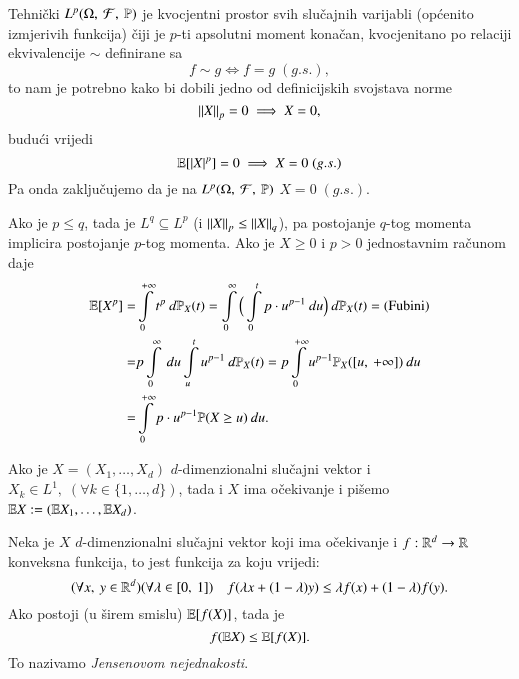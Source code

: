 \begin{nap} \label{nap:5.11-5}
    Tehni\v cki $L^p (\Omega, \: \mathcal{F}, \: \mathbb{P})$ je kvocjentni prostor svih slu\v cajnih varijabli (op\' cenito izmjerivih funkcija) \v ciji je $p$-ti apsolutni moment kona\v can, kvocjenitano po relaciji ekvivalencije $\sim$ definirane sa
    \begin{equation*}
        f \sim g \iff f = g \; (g.s.),
    \end{equation*}
    to nam je potrebno kako bi dobili jedno od definicijskih svojstava norme
    \begin{equation*}
        \left\lVert {X} \right\rVert_p = 0 \implies X = 0,
    \end{equation*}
    budu\' ci vrijedi
    \begin{equation*}
        \mathbb{E} [|X|^p] = 0 \implies X = 0 \; (g.s.)
    \end{equation*}
    Pa onda zaklju\v cujemo da je na $L^p (\Omega, \: \mathcal{F}, \: \mathbb{P})$ $X = 0 \; (g.s.)$.
\end{nap}

Ako je $p \leq q$, tada je $L^q \subseteq L^p$ (i $\left\lVert {X} \right\rVert_p \leq \left\lVert {X} \right\rVert_q$), pa postojanje $q$-tog momenta implicira postojanje $p$-tog momenta.
Ako je $X \geq 0$ i $p > 0$ jednostavnim ra\v cunom daje
\begin{align}   \label{jed:5.12}
    \begin{split}
        \mathbb{E} [ X^p ] =& \int\limits_0^{+\infty} t^p \: d \mathbb{P}_X (t) = \int\limits_0^{\infty} \Big( \int\limits_0^t p \cdot u^{p - 1} \: d u \Big) \: d \mathbb{P}_X(t) = (\textnormal{Fubini})\\
        =& p \int\limits_0^{\infty} \: du \int\limits_u^t u ^{p-1} \: d \mathbb{P}_X (t) = p \int\limits_0^{+\infty} u^{p-1} \mathbb{P}_X ([{u}, \:{+\infty}]) \: du \\
        =& \int\limits_0^{+\infty} p \cdot u^{p-1} \mathbb{P}({X \geq u}) \: du.
    \end{split}
\end{align}

Ako je $X = (X_1, \ldots, X_d)$ $d$-dimenzionalni slu\v cajni vektor i $X_k \in L^1, \; (\forall k \in \{1, \ldots, d\})$, tada i $X$ ima o\v cekivanje i pi\v semo $\mathbb{E} X := (\mathbb{E} X_1, \ldots, \mathbb{E} X_d)$.

\begin{zad} \label{zad:5.13}
    Neka je $X$ $d$-dimenzionalni slu\v cajni vektor koji ima o\v cekivanje i $f: \mathbb{R}^d \to \mathbb{R}$ konveksna funkcija, to jest funkcija za koju vrijedi:
    \begin{equation*}
        (\forall x, \: y \in \mathbb{R}^d)(\forall \lambda \in [{0}, \:{1}]) \quad f (\lambda x + (1 - \lambda) y) \leq \lambda f(x) + (1 - \lambda) f(y).
    \end{equation*}
    Ako  postoji (u \v sirem smislu) $\mathbb{E} [ f(X) ]$, tada je
    \begin{equation*}
        f (\mathbb{E} X) \leq \mathbb{E} [ f(X) ].
    \end{equation*}
    To nazivamo \emph{Jensenovom nejednakosti}.
\end{zad}

